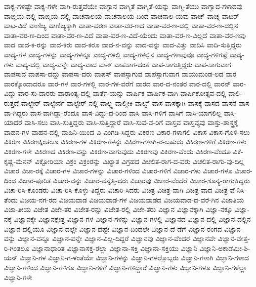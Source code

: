 {ವಾಕ್ಯ-ಗಳಷ್ಟೇ
ವಾಕ್ಯ-ಗಳೇ
ವಾಗಿ-ರುತ್ತವೆಯೇ
ವಾಗ್ದಾನ
ವಾಗ್ಮಿತೆ
ವಾಗ್ಮಿತೆ-ಯನ್ನು
ವಾಗ್ಮಿ-ತೆಯು
ವಾಗ್ವಾದ-ಗಳಾದವು
ವಾಙ್ಞಯ-ದಲ್ಲಿ
ವಾಙ್ಮಯ-ದಲ್ಲಿ
ವಾಚನಾಲಯ
ವಾಚನಾಲಯ-ದಿಂದ
ವಾಚನಾಲ-ಯವು
ವಾಚ್
ವಾಚ್ನ
ವಾಟರ್
ವಾಟ-ವಿದೆ
ವಾಣಿಜ್ಯ
ವಾಣಿಜ್ಯಕ್ಕಾಗಿ
ವಾತಾ-ವರಣ
ವಾತಾ-ವರ-ಣದ
ವಾತಾ-ವರ-ಣ-ದಲ್ಲಿ
ವಾತಾ-ವರ-ಣ-ದಲ್ಲಿನ
ವಾತಾ-ವರ-ಣ-ದಿಂದ
ವಾತಾ-ವರ-ಣ-ವಿದೆ
ವಾತಾ-ವರ-ಣ-ವಿದೆ-ಯೆಂದು
ವಾತಾ-ವರ-ಣ-ವಿಲ್ಲದೆ
ವಾತಾ-ವರ-ಣವು
ವಾದ
ವಾದ-ಕ-ರನ್ನು
ವಾದ-ಕರು
ವಾದ-ಕರೂ
ವಾದ-ನ-ವನ್ನು
ವಾದ-ವನ್ನು
ವಾದ-ವಿತ್ತು
ವಾದಿಸಿ
ವಾದಿ-ಸುತ್ತಿದ್ದರು
ವಾದ್ಯ-ಗಳ
ವಾದ್ಯ-ಗಳನ್ನು
ವಾದ್ಯ-ಗಳನ್ನೂ
ವಾದ್ಯ-ಗಳಲ್ಲಿ
ವಾದ್ಯ-ಗಳಲ್ಲಿನ
ವಾದ್ಯ-ಗಳಾವುವೂ
ವಾದ್ಯ-ಗಳಿಗಷ್ಟೆ
ವಾದ್ಯ-ಗಳು
ವಾದ್ಯ-ದಲ್ಲಿ
ವಾದ್ಯ-ವನ್ನೇ
ವಾದ್ಯ-ವಾದ
ವಾನ್
ವಾಪಸಾಗ-ದಂತೆ
ವಾಪ-ಸಾಗುತ್ತಿದ್ದರು
ವಾಪ-ಸಾಗುವಾಗ
ವಾಪಸಾದ
ವಾಪಸಾ-ದದ್ದು
ವಾಪಸಾ-ದರು
ವಾಪಸ್
ವಾಪಸ್ಸಾಗುವ
ವಾಪಸ್ಸಾಗುವಾಗ
ವಾಯುಮಂಡ-ಲದ
ವಾರ
ವಾರಕ್ಕೊಂದಾದರೂ
ವಾರ-ಗಳ
ವಾರ-ಗಳಲ್ಲಿ
ವಾರ-ಗಳ-ವರೆಗೆ
ವಾರದ
ವಾರ-ದ-ನಂತರ
ವಾರ-ದಲ್ಲಿ
ವಾರನ್
ವಾರ-ವಿದ್ದು
ವಾರ-ಸು-ದಾರರು
ವಾರಾಂತ್ಯ-ದಲ್ಲಿ
ವಾರ್ತೆ-ಯನ್ನು
ವಾರ್ಷಿಕ
ವಾರ್ಷಿಕ-ವಾಗಿ
ವಾರ್ಷಿಕೋತ್ಸವ-ದಲ್ಲಿ
ವಾಲಿ-ರುತ್ತದೆ
ವಾಲ್ಟೇರ್
ವಾಲ್ಟೇರ್ನ
ವಾಲ್ಟೇರ್-ನಲ್ಲಿ
ವಾಲ್ಟ್ನ
ವಾಲ್ಮೀಕಿ
ವಾಲ್ವ್
ವಾಸ
ವಾಸಕ್ಕಾಗಿ
ವಾಸಕ್ಕೆ
ವಾಸದ
ವಾಸನೆ
ವಾಸ-ವಾ-ಗಿದ್ದರು
ವಾಸ-ವಾಗಿದ್ದಾ-ರೆಂದೂ
ವಾಸ-ವಿದ್ದು-ದ-ರಿಂದ
ವಾಸಿ
ವಾಸಿ-ಗಳಿಗೆ
ವಾಸಿಗೆ
ವಾಸಿ-ಯಾಗಲಿಲ್ಲ
ವಾಸಿ-ಯಾದರೆ
ವಾಸಿ-ಸಲು
ವಾಸಿ-ಸುತ್ತಿದ್ದರು
ವಾಸಿ-ಸುತ್ತಿದ್ದಾರೆ
ವಾಸಿ-ಸುವ-ವ-ರಿಗೆ
ವಾಸ್ತವ
ವಾಸ್ತವ್ಯವು
ವಾಸ್ತು-ಶಾಸ್ತ್ರಕ್ಕೆ
ವಾಹನ-ಗಳ
ವಾಹನ-ದಲ್ಲಿ
ವಾಹಿನಿ-ಯಿಂದ
ವಿ
ವಿಂಗಡಿ-ಸಿದ್ದರು
ವಿಕರಣ
ವಿಕಾರ-ಗಳಾಗಲಿ
ವಿಕಾಸ
ವಿಕಾಸ-ಗೊಳಿ-ಸಲು
ವಿಕಿರಣ
ವಿಕಿರಣಕ್ಕಿಂತಲೂ
ವಿಕಿರಣ-ಗಳ
ವಿಕಿರಣ-ಗಳನ್ನು
ವಿಕಿರಣ-ಗಳಾಗಿ-ರ-ಬಹುದು
ವಿಕಿರಣ-ಗಳಿಗೆ
ವಿಕಿರಣ-ಗಳು
ವಿಕಿರಣ-ಗಳೇ
ವಿಕಿರಣದ
ವಿಕಿರಣ-ವನ್ನು
ವಿಕಿರಣ-ವಾಗುವುದು
ವಿಕಿರಣವು
ವಿಕಿರಣ-ವೆಂದು
ವಿಕಿರಣ-ವೆಂದೂ
ವಿಕೆ-ಕೃಷ್ಣ-ಮೆನನ್
ವಿಕ್ಟೋರಿಯಾ
ವಿಕ್ರಂ
ವಿಕ್ರಂರನ್ನು
ವಿಖ್ಯಾತ
ವಿಗ್ರಹದ
ವಿಚಲಿತ-ರಾಗ-ದ-ವರು
ವಿಚಲಿತ-ರಾಗು-ವು-ದಿಲ್ಲ
ವಿಚಾರ
ವಿಚಾ-ರಕ್ಕೆ
ವಿಚಾರ-ಗಳ
ವಿಚಾರ-ಗಳನ್ನು
ವಿಚಾರ-ಗಳಿಂದ
ವಿಚಾರ-ಗಳಿಗೆ
ವಿಚಾರ-ಗಳು
ವಿಚಾರ-ಗಳೂ
ವಿಚಾರ-ದಿಂದ
ವಿಚಾರ-ಪೂರಿತ
ವಿಚಾರ-ವನ್ನು
ವಿಚಾರ-ವನ್ನೆತ್ತಿ-ದರು
ವಿಚಾರವು
ವಿಚಾರ-ವೆಂದರೆ
ವಿಚಾರ-ಶೂನ್ಯ-ರಾಗುತ್ತಿದ್ದರು
ವಿಚಾ-ರಿಸಿ-ಕೊಂಡರು
ವಿಚಾ-ರಿಸಿ-ಕೊಳ್ಳು-ತಿದ್ದರು
ವಿಚಾರಿ-ಸಿದರು
ವಿಚಿತ್ರ
ವಿಚಿತ್ರ-ವಾಗಿ
ವಿಚಿತ್ರ-ವಾದ
ವಿಚಿತ್ರ-ವೆ-ನಿಸಿ-ತೆಂದು
ವಿಜಯ-ನಗ-ರದ
ವಿಜಯವಾಡ
ವಿಜಯವಾಡ-ಗಳ
ವಿಜಯವಾಡದ
ವಿಜಯವಾಡ-ದ-ವರೆ-ಗಿನ
ವಿಜಾತಿಯ
ವಿಜಾ-ತೀಯ
ವಿಜೇತ
ವಿಜೇ-ತರ
ವಿಜೇತ-ರನ್ನು
ವಿಜೇತ-ರಲ್ಲಿ
ವಿಜೇ-ತರು
ವಿಜ್ಞಾನ
ವಿಜ್ಞಾನಕ್ಕಾಗಿ
ವಿಜ್ಞಾ-ನಕ್ಕೂ
ವಿಜ್ಞಾ-ನಕ್ಕೆ
ವಿಜ್ಞಾನಕ್ಕೇ
ವಿಜ್ಞಾನಕ್ಷೇತ್ರ
ವಿಜ್ಞಾನ-ಗಳ
ವಿಜ್ಞಾನ-ಗಳನ್ನು
ವಿಜ್ಞಾನ-ಗಳಲ್ಲಿ
ವಿಜ್ಞಾನದ
ವಿಜ್ಞಾನ-ದಲ್ಲಿ
ವಿಜ್ಞಾನ-ದಲ್ಲಿನ
ವಿಜ್ಞಾನ-ದಲ್ಲಿಯೂ
ವಿಜ್ಞಾನ-ದಲ್ಲೇ
ವಿಜ್ಞಾನ-ದಷ್ಟೇ
ವಿಜ್ಞಾನ-ದಿಂದಲೇ
ವಿಜ್ಞಾನ-ದೆ-ಡೆಗೆ
ವಿಜ್ಞಾನ-ರಂಗದ
ವಿಜ್ಞಾನ-ವನ್ನು
ವಿಜ್ಞಾನ-ವನ್ನೂ
ವಿಜ್ಞಾನ-ವನ್ನೇ
ವಿಜ್ಞಾನ-ವಿಲ್ಲ-ದಿದ್ದರೆ
ವಿಜ್ಞಾನವು
ವಿಜ್ಞಾನ-ವೆಂದರೆ
ವಿಜ್ಞಾನವೇ
ವಿಜ್ಞಾನ-ವೇತ್ತ-ರಿ-ಗಿಂತಲೂ
ವಿಜ್ಞಾನಾಧಾರಿತ
ವಿಜ್ಞಾನಾಸಕ್ತ-ರೆಲ್ಲಾ
ವಿಜ್ಞಾನಾ-ಸಕ್ತಿ
ವಿಜ್ಞಾನಾ-ಸಕ್ತಿಯು
ವಿಜ್ಞಾನಿ
ವಿಜ್ಞಾನಿ-ಅಕಾಡೆಮೀ-ಶಿ-ಯನ್
ವಿಜ್ಞಾನಿ-ಗಳ
ವಿಜ್ಞಾನಿ-ಗ-ಳಂತೆಯೇ
ವಿಜ್ಞಾನಿ-ಗಳನ್ನು
ವಿಜ್ಞಾನಿ-ಗಳಲ್ಲೊಬ್ಬರು
ವಿಜ್ಞಾನಿ-ಗಳಾಗಿ
ವಿಜ್ಞಾನಿ-ಗಳಾದ
ವಿಜ್ಞಾನಿ-ಗಳಿಂದ
ವಿಜ್ಞಾನಿ-ಗಳಿಗೂ
ವಿಜ್ಞಾನಿ-ಗಳಿಗೆ
ವಿಜ್ಞಾನಿ-ಗಳಿದ್ದಾರೆ
ವಿಜ್ಞಾನಿ-ಗಳು
ವಿಜ್ಞಾನಿ-ಗಳೂ
ವಿಜ್ಞಾನಿ-ಗಳೆಲ್ಲಾ
ವಿಜ್ಞಾನಿ-ಗಳೇ
}
